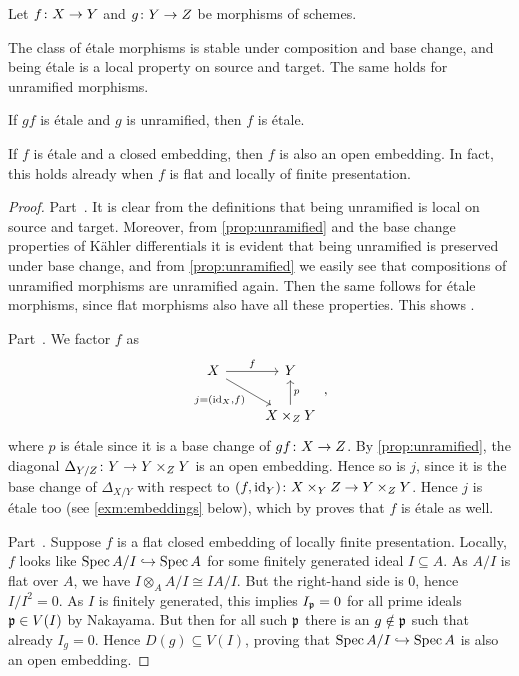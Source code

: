 \begin{fact}\label{fact:etaleProperties}
	Let $f\colon X\morphism Y$ and $g\colon Y\morphism Z$ be morphisms of schemes.
	\begin{alphanumerate}
		\item The class of étale morphisms is stable under composition and base change, and being étale is a local property on source and target. The same holds for unramified morphisms.
		\item If $gf$ is étale and $g$ is unramified, then $f$ is étale.
		\item If $f$ is étale and a closed embedding, then $f$ is also an open embedding. In fact, this holds already when $f$ is flat and locally of finite presentation.
	\end{alphanumerate}
\end{fact}
\begin{proof}
	Part~. It is clear from the definitions that being unramified is local on source and target. Moreover, from \cref{prop:unramified} and the base change properties of Kähler differentials it is evident that being unramified is preserved under base change, and from \cref{prop:unramified} we easily see that compositions of unramified morphisms are unramified again. Then the same follows for étale morphisms, since flat morphisms also have all these properties. This shows .
	
	Part~. We factor $f$ as
	\begin{equation*}
		\begin{tikzcd}
			X\rar["f"]\drar["{j=(\id_X,f)}"{swap}]& Y\\
			& X\times_ZY\uar["p"{swap}]
		\end{tikzcd}\,,
	\end{equation*}
	where $p$ is étale since it is a base change of $gf\colon X\morphism Z$. By \cref{prop:unramified}, the diagonal $\Delta_{Y/Z}\colon Y\morphism Y\times_ZY$ is an open embedding. Hence so is $j$, since it is the base change of $\Delta_{X/Y}$ with respect to $(f,\id_Y)\colon X\times_YZ\morphism Y\times_ZY$. Hence $j$ is étale too (see \cref{exm:embeddings} below), which by  proves that $f$ is étale as well.
	
	Part~. Suppose $f$ is a flat closed embedding of locally finite presentation. Locally, $f$ looks like $\Spec A/I\monomorphism \Spec A$ for some finitely generated ideal $I\subseteq A$. As $A/I$ is flat over $A$, we have $I\otimes_AA/I\cong IA/I$. But the right-hand side is $0$, hence $I/I^2=0$. As $I$ is finitely generated, this implies $I_{\mathfrak{p}}=0$ for all prime ideals $\mathfrak{p}\in V(I)$ by Nakayama. But then for all such $\mathfrak{p}$ there is an $g\notin\mathfrak{p}$ such that already $I_g=0$. Hence $D(g)\subseteq V(I)$, proving that $\Spec A/I\monomorphism\Spec A$ is also an open embedding.
\end{proof}
